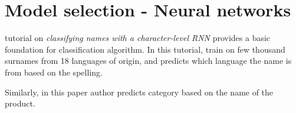 \chapter{Model selection - Neural networks}

\parencite{sean} tutorial on \textit{classifying names with a character-level \acs{RNN}} provides a basic foundation for classification algorithm. In this tutorial,  train on few thousand surnames from 18 languages of origin, and predicts which language the name is from based on the spelling. 

Similarly, in this paper author predicts category based on the name of the product. 
